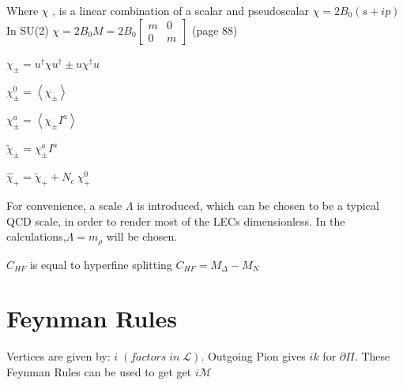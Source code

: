 \documentclass{article}
\begin{document}
Where $ \chi $ , is a linear combination of a scalar and pseudoscalar \cite{Fernando2018} $ \chi = 2B_0 (s+ip)$ In SU(2) $\chi = 2B_0 M = 2B_0 \left[ \begin{array}{cc}
m & 0 \\
0 & m\end{array} \right] $ \cite{scherer2003introduction} (page 88)



$ \chi_{\pm}  = u^{\dagger} \chi u^{\dagger} \pm u \chi^{\dagger} u $ 

$ \chi_{\pm}^{0} =\left\langle\chi_{\pm}\right\rangle $

$  \chi_{\pm}^{a}  = \left\langle\chi_{\pm} I^a\right\rangle   $

$ \tilde{\chi}_{\pm} = \chi_{\pm}^{a} I^{a} $

\vspace{5mm}

$ \hat{\chi}_{+} = \tilde{\chi}_{+} + N_c \: \chi_{+}^{0} $

For convenience, a scale $ \Lambda $ is introduced, which can be chosen to be a typical QCD scale, in order to render most of the LECs dimensionless. In the calculations,$ \Lambda = m_\rho $ will be chosen.\cite{Fernando2018}

$C_{HF}$ is equal to hyperfine splitting $C_{HF} = M_\Delta -M_N $ 

\newpage
\section{Feynman Rules}

Vertices are given by:  $i \; (factors \;in \; \mathcal{L})$. Outgoing Pion gives $ik$ for $\partial \Pi$. These Feynman Rules can be used to get get $i \mathcal{M}$
\end{document}
